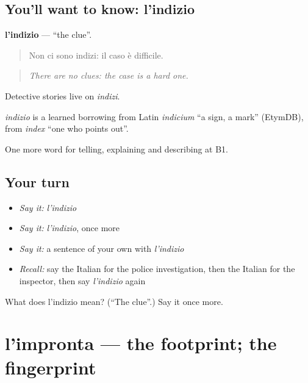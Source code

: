 \subsection*{You'll want to know: l'indizio}
\textbf{l'indizio} — \textquotedblleft{}the clue\textquotedblright{}.

\begin{quote}
Non ci sono indizi: il caso è difficile.
\end{quote}

\begin{quote}
\emph{There are no clues: the case is a hard one.}
\end{quote}

Detective stories live on \emph{indizi}.

\begin{cousinweb}
\emph{indizio} is a learned borrowing from Latin \emph{indicium} \textquotedblleft{}a sign, a mark\textquotedblright{} (EtymDB), from \emph{index} \textquotedblleft{}one who points out\textquotedblright{}.
\end{cousinweb}

\begin{grammarlens}[title={What you've built}]
One more word for telling, explaining and describing at B1.
\end{grammarlens}

\subsection*{Your turn}
\begin{itemize}
\raggedright
  \item \emph{Say it:} \emph{l'indizio}
  \item \emph{Say it:} \emph{l'indizio}, once more
  \item \emph{Say it:} a sentence of your own with \emph{l'indizio}
  \item \emph{Recall:} say the Italian for the police investigation, then the Italian for the inspector, then say \emph{l'indizio} again
\end{itemize}

\begin{tcolorbox}[breakable,colback=teal!4,colframe=teal!35!black,title={Before you move on}]
What does l'indizio mean? (\textquotedblleft{}The clue\textquotedblright{}.) Say it once more.
\end{tcolorbox}
\section[l'impronta]{l'impronta — the footprint; the fingerprint}

